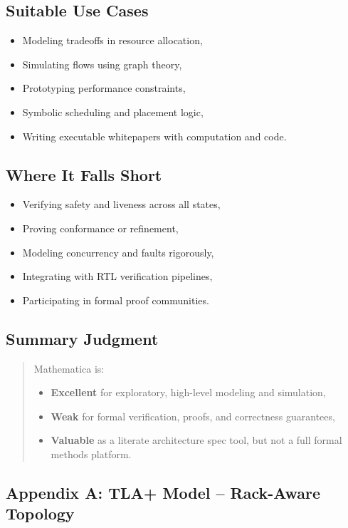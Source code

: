\documentclass[../../../OAE-SPEC-MAIN.tex]{subfiles}
\begin{document}
\subsection*{Suitable Use Cases}

\begin{itemize}
  \item Modeling tradeoffs in resource allocation,
  \item Simulating flows using graph theory,
  \item Prototyping performance constraints,
  \item Symbolic scheduling and placement logic,
  \item Writing executable whitepapers with computation and code.
\end{itemize}

\subsection*{Where It Falls Short}

\begin{itemize}
  \item Verifying safety and liveness across all states,
  \item Proving conformance or refinement,
  \item Modeling concurrency and faults rigorously,
  \item Integrating with RTL verification pipelines,
  \item Participating in formal proof communities.
\end{itemize}

\subsection{Summary Judgment}

\begin{quote}
Mathematica is:
\begin{itemize}
  \item \textbf{Excellent} for exploratory, high-level modeling and simulation,
  \item \textbf{Weak} for formal verification, proofs, and correctness guarantees,
  \item \textbf{Valuable} as a literate architecture spec tool, but not a full formal methods platform.
\end{itemize}
\end{quote}

\subsection{Appendix A: TLA+ Model -- Rack-Aware Topology}
\end{document}
